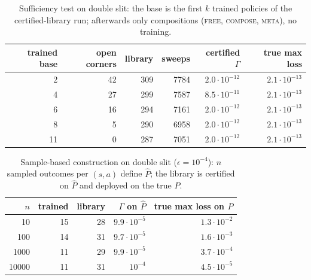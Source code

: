 \begin{table}[h]\centering\small
\caption{Sufficiency test on double slit: the base is the first $k$ trained policies of the certified-library run; afterwards only compositions (\textsc{free}, \textsc{compose}, \textsc{meta}), no training.}\label{tab:suff}
\begin{tabular}{rrrrrr}
\toprule
trained base & open corners & library & sweeps & certified $\Gamma$ & true max loss\\
\midrule
2 & 42 & 309 & 7784 & $2.0\cdot10^{-12}$ & $2.1\cdot10^{-13}$\\
4 & 27 & 299 & 7587 & $8.5\cdot10^{-11}$ & $2.1\cdot10^{-13}$\\
6 & 16 & 294 & 7161 & $2.0\cdot10^{-12}$ & $2.1\cdot10^{-13}$\\
8 & 5 & 290 & 6958 & $2.0\cdot10^{-12}$ & $2.1\cdot10^{-13}$\\
11 & 0 & 287 & 7051 & $2.0\cdot10^{-12}$ & $2.1\cdot10^{-13}$\\
\bottomrule
\end{tabular}
\end{table}

\begin{table}[h]\centering\small
\caption{Sample-based construction on double slit ($\epsilon=10^{-4}$): $n$ sampled outcomes per $(s,a)$ define $\hat P$; the library is certified on $\hat P$ and deployed on the true $P$.}\label{tab:sampled}
\begin{tabular}{rrrrr}
\toprule
$n$ & trained & library & $\Gamma$ on $\hat P$ & true max loss on $P$\\
\midrule
10 & 15 & 28 & $9.9\cdot10^{-5}$ & $1.3\cdot10^{-2}$\\
100 & 14 & 31 & $9.7\cdot10^{-5}$ & $1.6\cdot10^{-3}$\\
1000 & 11 & 29 & $9.9\cdot10^{-5}$ & $3.7\cdot10^{-4}$\\
10000 & 11 & 31 & $10^{-4}$ & $4.5\cdot10^{-5}$\\
\bottomrule
\end{tabular}
\end{table}

